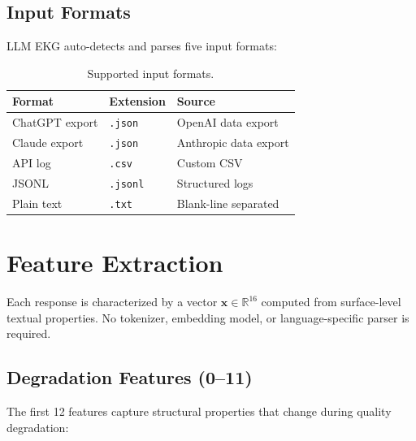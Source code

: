 \documentclass[11pt,a4paper]{article}
\begin{document}
\subsection{Input Formats}

LLM EKG auto-detects and parses five input formats:

\begin{table}[h]
\centering
\begin{tabular}{lll}
\toprule
\textbf{Format} & \textbf{Extension} & \textbf{Source} \\
\midrule
ChatGPT export & \texttt{.json} & OpenAI data export \\
Claude export & \texttt{.json} & Anthropic data export \\
API log & \texttt{.csv} & Custom CSV \\
JSONL & \texttt{.jsonl} & Structured logs \\
Plain text & \texttt{.txt} & Blank-line separated \\
\bottomrule
\end{tabular}
\caption{Supported input formats.}
\end{table}

\section{Feature Extraction}

Each response is characterized by a vector $\mathbf{x} \in \mathbb{R}^{16}$ computed from surface-level textual properties. No tokenizer, embedding model, or language-specific parser is required.

\subsection{Degradation Features (0--11)}

The first 12 features capture structural properties that change during quality degradation:
\end{document}
